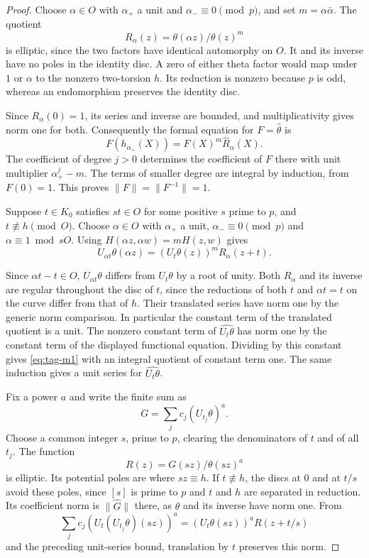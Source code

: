 \begin{proof}

Choose \(\alpha\in O\) with \(\alpha_+\) a unit and
\(\alpha_-\equiv0\pmod p\), and set \(m=\alpha\bar\alpha\).
The quotient
\[
 R_\alpha(z)=\theta(\alpha z)/\theta(z)^m
\]
is elliptic, since the two factors have identical automorphy
on \(O\). It and its inverse have no poles in the identity
disc. A zero of either theta factor would map under \(1\)
or \(\alpha\) to the nonzero two-torsion \(h\). Its
reduction is nonzero because \(p\) is odd, whereas an
endomorphism preserves the identity disc.

Since \(R_\alpha(0)=1\),
its series and inverse are bounded, and multiplicativity gives
norm one for both. Consequently the formal equation for
\(F=\widehat\theta\) is
\[
                  F(h_{\alpha_+}(X))=F(X)^m\widehat R_\alpha(X).
\tag{M1}\label{eq:tag-m1}
\]
The coefficient of degree \(j>0\) determines the coefficient
of \(F\) there with unit multiplier \(\alpha_+^j-m\).
The terms of smaller degree are integral by induction, from
\(F(0)=1\). This proves \(\|F\|=\|F^{-1}\|=1\).


Suppose \(t\in K_0\) satisfies \(s t\in O\) for some positive
\(s\) prime to \(p\), and \(t\not\equiv h\pmod O\).
Choose \(\alpha\in O\) with \(\alpha_+\) a unit,
\(\alpha_-\equiv0\pmod p\) and \(\alpha\equiv1\bmod sO\).
Using \(H(\alpha z,\alpha w)=mH(z,w)\) gives
\[
 U_{\alpha t}\theta(\alpha z)=(U_t\theta(z))^m R_\alpha(z+t).
\]

Since \(\alpha t-t\in O\), \(U_{\alpha t}\theta\) differs from
\(U_t\theta\) by a root of unity. Both \(R_\alpha\) and its
inverse are regular throughout the disc of \(t\), since the
reductions of both \(t\) and \(\alpha t=t\) on the curve
differ from that of \(h\). Their translated series have
norm one by the generic norm comparison. In particular the
constant term of the translated quotient is a unit. The
nonzero constant term of \(\widehat{U_t\theta}\) has norm one
by the constant term of the displayed functional equation.
Dividing by this constant gives \eqref{eq:tag-m1} with an integral
quotient of constant term one. The same induction gives a
unit series for \(\widehat{U_t\theta}\).


Fix a power \(a\) and write the finite sum as
\[
  G=\sum_j c_j(U_{t_j}\theta)^a.
\]
Choose a common integer \(s\), prime to \(p\), clearing the denominators of \(t\) and of all \(t_j\).
The function
\[
               R(z)=G(sz)/\theta(sz)^a
\]
is elliptic. Its potential poles are where \(sz\equiv h\).
If \(t\not\equiv h\), the discs at \(0\) and at \(t/s\) avoid
these poles, since \([s]\) is prime to \(p\) and \(t\) and
\(h\) are separated in reduction. Its coefficient norm is
\(\|\widehat G\|\) there, as \(\widehat\theta\) and its inverse
have norm one. From
\[
       \sum_j c_j (U_t(U_{t_j}\theta)(sz))^a
                =(U_t\theta(sz))^a R(z+t/s)
\]
and the preceding unit-series bound, translation by \(t\)
preserves this norm.


\end{proof}
